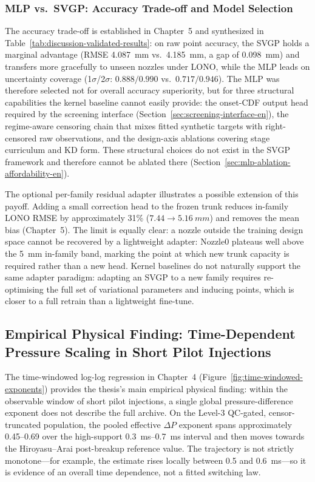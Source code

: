 \subsubsection*{MLP vs.\ SVGP: Accuracy Trade-off and Model Selection}

The accuracy trade-off is established in Chapter~5 and synthesized in Table~\ref{tab:discussion-validated-results}: on raw point accuracy, the SVGP holds a marginal advantage (RMSE \SI{4.087}{mm} vs.\ \SI{4.185}{mm}, a gap of \SI{0.098}{mm}) and transfers more gracefully to unseen nozzles under LONO, while the MLP leads on uncertainty coverage (1$\sigma$/2$\sigma$: $0.888/0.990$ vs.\ $0.717/0.946$). The MLP was therefore selected not for overall accuracy superiority, but for three structural capabilities the kernel baseline cannot easily provide: the onset-CDF output head required by the screening interface (Section~\ref{sec:screening-interface-en}), the regime-aware censoring chain that mixes fitted synthetic targets with right-censored raw observations, and the design-axis ablations covering stage curriculum and KD form. These structural choices do not exist in the SVGP framework and therefore cannot be ablated there (Section~\ref{sec:mlp-ablation-affordability-en}).

The optional per-family residual adapter illustrates a possible extension of this payoff.
Adding a small correction head to the frozen trunk reduces in-family LONO RMSE by
approximately 31\% ($7.44 \rightarrow \SI{5.16}{mm}$) and removes the mean bias (Chapter~5).
The limit is equally clear: a nozzle outside the training design space cannot be
recovered by a lightweight adapter: Nozzle0 plateaus well above the \SI{5}{mm}
in-family band, marking the point at which new trunk capacity is required rather than
a new head. Kernel baselines do not naturally support the same adapter paradigm: adapting an SVGP to a
new family requires re-optimising the full set of variational parameters and inducing
points, which is closer to a full retrain than a lightweight fine-tune.

\subsection{Empirical Physical Finding: Time-Dependent Pressure Scaling in Short Pilot Injections}
\label{sec:time-varying-scaling-discussion-en}

The time-windowed log-log regression in Chapter~4 (Figure~\ref{fig:time-windowed-exponents}) provides the thesis's main empirical physical finding: within the observable window of short pilot injections, a single global pressure-difference exponent does not describe the full archive. On the Level-3 QC-gated, censor-truncated population, the pooled effective \(\Delta P\) exponent spans approximately 0.45--0.69 over the high-support \SIrange{0.3}{0.7}{ms} interval and then moves towards the Hiroyasu--Arai post-breakup reference value. The trajectory is not strictly monotone---for example, the estimate rises locally between 0.5 and \SI{0.6}{ms}---so it is evidence of an overall time dependence, not a fitted switching law.

